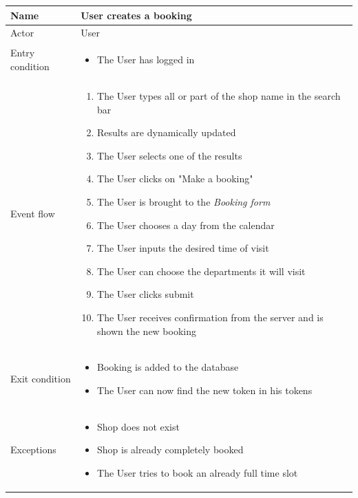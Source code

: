 \begin{table}[H]
    \begin{tabu} to \textwidth {|X|X[4]|}
        \hline
        Name            & User creates a booking     \\ \hline
        Actor           & User                       \\ \hline
        Entry condition & \begin{itemize}
            \item The User has logged in
        \end{itemize} \\ \hline
        Event flow      & \begin{enumerate}
            \item The User types all or part of the shop name in the search bar
            \item Results are dynamically updated
            \item The User selects one of the results
            \item The User clicks on "Make a booking"
            \item The User is brought to the \emph{Booking form}
            \item The User chooses a day from the calendar
            \item The User inputs the desired time of visit
            \item The User can choose the departments it will visit
            \item The User clicks submit
            \item The User receives confirmation from the server and is shown the new booking
        \end{enumerate} \\ \hline
        Exit condition  & \begin{itemize}
            \item Booking is added to the database
            \item The User can now find the new token in his tokens
        \end{itemize} \\ \hline
        Exceptions      & \begin{itemize}
            \item Shop does not exist
            \item Shop is already completely booked
            \item The User tries to book an already full time slot
        \end{itemize} \\ \hline
    \end{tabu}
\end{table}


